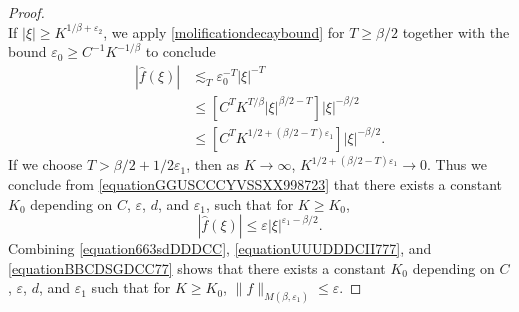 \documentclass[12pt,reqno]{article}
\numberwithin{equation}{section}
\begin{document}
\begin{proof}
\begin{equation}
    \end{equation}
    If $|\xi| \geq K^{1/\beta + \varepsilon_2}$, we apply \eqref{molificationdecaybound} for $T \geq \beta/2$ together with the bound $\varepsilon_0 \geq C^{-1} K^{-1/\beta}$ to conclude
    \begin{equation} \label{equationGGUSCCCYVSSXX998723}
    \begin{split}
        |\widehat{f}(\xi)| &\lesssim_T \varepsilon_0^{-T} |\xi|^{-T}\\
        &\leq \left[ C^T K^{T/\beta} |\xi|^{\beta/2 - T} \right] |\xi|^{-\beta/2}\\
        &\leq \left[ C^T K^{1/2 + (\beta/2 - T) \varepsilon_1} \right] |\xi|^{-\beta/2}.
    \end{split}
    \end{equation}
    If we choose $T > \beta/2 + 1/2 \varepsilon_1$, then as $K \to \infty$, $K^{1/2 + (\beta/2 - T) \varepsilon_1} \to 0$. Thus we conclude from \eqref{equationGGUSCCCYVSSXX998723} that there exists a constant $K_0$ depending on $C$, $\varepsilon$, $d$, and $\varepsilon_1$, such that for $K \geq K_0$,
    \begin{equation} \label{equationBBCDSGDCC77}
        |\widehat{f}(\xi)| \leq \varepsilon |\xi|^{\varepsilon_1-\beta/2}.
    \end{equation}
    Combining \eqref{equation663sdDDDCC}, \eqref{equationUUUDDDCII777}, and \eqref{equationBBCDSGDCC77} shows that there exists a constant $K_0$ depending on $C$, $\varepsilon$, $d$, and $\varepsilon_1$ such that for $K \geq K_0$, $\| f \|_{M(\beta,\varepsilon_1)} \leq \varepsilon$.
\end{proof}
\end{document}

